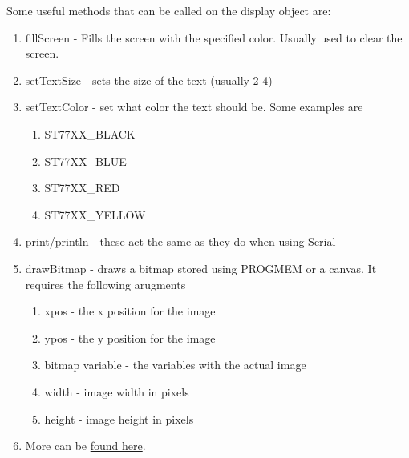 Some useful methods that can be called on the display object are:
\begin{enumerate}
	\item fillScreen - Fills the screen with the specified color. Usually used to clear the screen.
	\item setTextSize - sets the size of the text (usually 2-4)
	\item setTextColor - set what color the text should be. Some examples are 
	\begin{enumerate}
        \item ST77XX\_BLACK
        \item ST77XX\_BLUE
        \item ST77XX\_RED
        \item ST77XX\_YELLOW
    \end{enumerate}
	\item print/println - these act the same as they do when using Serial
	\item drawBitmap - draws a bitmap stored using PROGMEM or a canvas. It requires the following arugments
	\begin{enumerate}
		\item xpos - the x position for the image
		\item ypos - the y position for the image
		\item bitmap variable - the variables with the actual image
		\item width - image width in pixels
		\item height - image height in pixels 
	\end{enumerate}
	\item More can be \href{https://learn.adafruit.com/adafruit-gfx-graphics-library/graphics-primitives}{found here}.
\end{enumerate}

